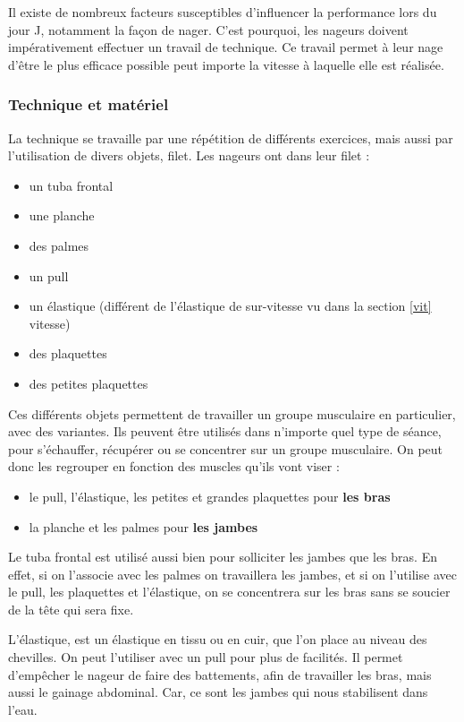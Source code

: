 Il existe de nombreux facteurs susceptibles d'influencer la performance lors du jour J, notamment la façon de nager. C'est pourquoi, les nageurs doivent impérativement effectuer un travail de technique. Ce travail permet à leur nage d'être le plus efficace possible peut importe la vitesse à laquelle elle est réalisée.


\subsubsection{Technique et matériel}

La technique se travaille par une répétition de différents exercices, mais aussi par l'utilisation de divers objets, \gls{filet}. Les nageurs ont dans leur \gls{filet} :

\begin{itemize}
\item un tuba frontal
\item une planche
\item des palmes
\item un pull
\item un élastique (différent de l'élastique de sur-vitesse vu dans la section \ref{vit} vitesse)
\item des plaquettes
\item des petites plaquettes
\end{itemize}

Ces différents objets permettent de travailler un groupe musculaire en particulier, avec des variantes. Ils peuvent être utilisés dans n'importe quel type de séance, pour s'échauffer, récupérer ou se concentrer sur un groupe musculaire. On peut donc les regrouper en fonction des muscles qu'ils vont viser :
\begin{itemize}
\item le pull, l'élastique, les petites et grandes plaquettes pour \textbf{les bras}
\item la planche et les palmes pour \textbf{les jambes}
\end{itemize}
Le tuba frontal est utilisé aussi bien pour solliciter les jambes que les bras. En effet, si on l'associe avec les palmes on travaillera les jambes, et si on l'utilise avec le pull, les plaquettes et l'élastique, on se concentrera sur les bras sans se soucier de la tête qui sera fixe.

\vspace{12pt}

L'élastique, est un élastique en tissu ou en cuir, que l'on place au niveau des chevilles. On peut l'utiliser avec un pull pour plus de facilités. Il permet d'empêcher le nageur de faire des battements, afin de travailler les bras, mais aussi le gainage abdominal. Car, ce sont les jambes qui nous stabilisent dans l'eau.

